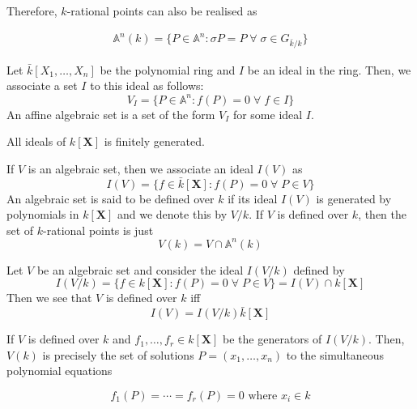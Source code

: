 \documentclass[oneside, 12pt]{scrbook}
\newcommand{\Aa}{\mathbb{A}}
\theoremstyle{theorem}
\begin{document}
Therefore, $k$-rational points can also be realised as 

\begin{eqnarray}
\Aa^n (k) = \{P \in \Aa^n : \sigma P = P \; \forall \; \sigma \in G_{\bar{k}/k}\}
\end{eqnarray}

\begin{definition}
Let $\bar{k}[X_{1}, \hdots , X_{n}]$ be the polynomial ring and $I$ be an ideal in the ring. Then, we associate a set $I$ to this ideal as follows: 
\begin{equation}
V_{I} = \{P \in \Aa^n : f(P)=0 \; \forall \; f\in I\}
\end{equation}
An affine algebraic set is a set of the form $V_{I}$ for some ideal $I$.
\end{definition}

\begin{theorem}
All ideals of $k[\mathbf{X}]$ is finitely generated.
\end{theorem}

\begin{definition}
If $V$ is an algebraic set, then we associate an ideal $I(V)$ as 
\begin{equation}
I(V) = \{f \in \bar{k}[\mathbf{X}]: f(P)=0 \; \forall \; P \in V\}
\end{equation}
An algebraic set is said to be defined over $k$ if its ideal $I(V)$ is generated by polynomials in $k[\mathbf{X}]$ and we denote this by $V/k$. If $V$ is defined over $k$, then the set of $k$-rational points is just $$V(k) = V \cap \Aa^n (k)$$
\end{definition}

\begin{remark}
Let $V$ be an algebraic set and consider the ideal $I(V/k)$ defined by 
\begin{equation}
I(V/k) = \{f \in k [\mathbf{X}]: f(P)=0 \; \forall\; P \in V\} = I(V) \cap k[\mathbf{X}]
\end{equation}
Then we see that $V$ is defined over $k$ iff $$I(V) = I(V/k)\bar{k}[\mathbf{X}]$$ 
\end{remark}

If $V$ is defined over $k$ and $f_{1}, \hdots , f_{r} \in k[\mathbf{X}]$ be the generators of $I(V/k)$. Then, $V(k)$ is precisely the set of solutions $P=(x_{1}, \hdots , x_{n})$ to the simultaneous polynomial equations 

\begin{equation}
f_{1}(P) = \cdots = f_{r}(P)=0 \text{ where } x_{i} \in k
\end{equation}
\end{document}
